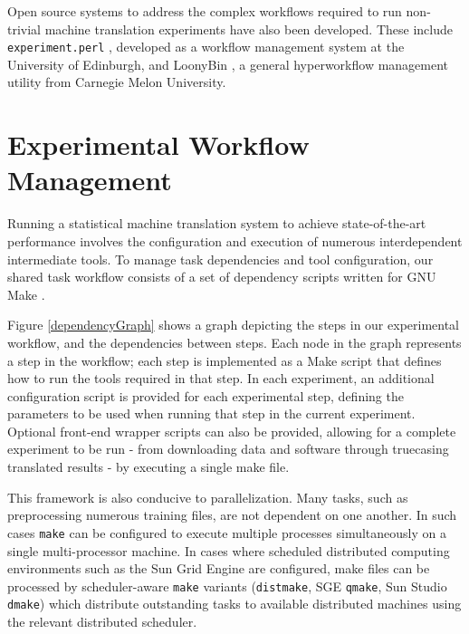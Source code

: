 \documentclass[11pt]{article}
\begin{document}
Open source systems to address the complex workflows required to run non-trivial machine translation experiments have also been developed. These include {\tt experiment.perl} \cite{experiment.perl}, developed as a workflow management system at the University of Edinburgh, and LoonyBin \cite{LoonyBin}, a general hyperworkflow management utility from Carnegie Melon University.







\section{Experimental Workflow Management}
\label{Framework}


Running a statistical machine translation system to achieve state-of-the-art performance involves the configuration and execution of numerous interdependent intermediate tools. To manage task dependencies and tool configuration, our shared task workflow consists of a set of dependency scripts written for GNU Make \cite{gnumake}. 

Figure \ref{dependencyGraph} shows a graph depicting the steps in our experimental workflow, and the dependencies between steps. Each node in the graph represents a step in the workflow; each step is implemented as a Make script that defines how to run the tools required in that step. In each experiment, an additional configuration script is provided for each experimental step, defining the parameters to be used when running that step in the current experiment. Optional front-end wrapper scripts can also be provided, allowing for a complete experiment to be run - from downloading data and software through truecasing translated results - by executing a single make file.

This framework is also conducive to parallelization. Many tasks, such as preprocessing numerous training files, are not dependent on one another. In such cases {\tt make} can be configured to execute multiple processes simultaneously on a single multi-processor machine. In cases where scheduled distributed computing environments such as the Sun Grid Engine are configured, make files can be processed by scheduler-aware {\tt make} variants ({\tt distmake}, SGE {\tt qmake}, Sun Studio {\tt dmake}) which distribute outstanding tasks to available distributed machines using the relevant distributed scheduler.
\end{document}
